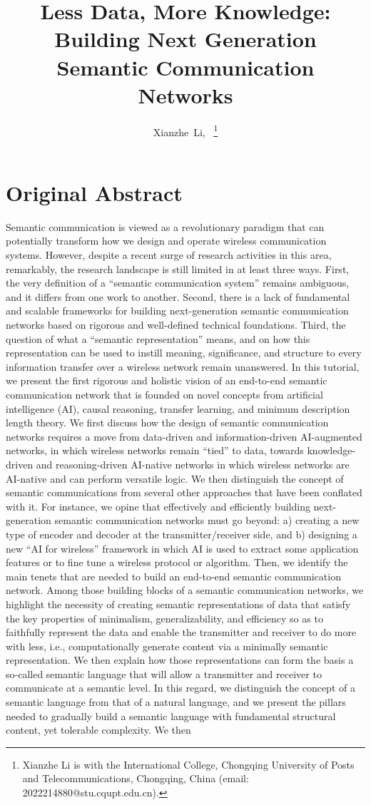\documentclass[journal]{IEEEtran}
\title{Less Data, More Knowledge: Building Next Generation Semantic Communication Networks}
\author{Xianzhe~Li,~\IEEEmembership{Student ID:~2022214880} 
\thanks{Xianzhe Li is with the International College, Chongqing University of Posts and Telecommunications, Chongqing, China (email: 2022214880@stu.cqupt.edu.cn).}
}
\begin{document}
\maketitle

\section{Original Abstract}
Semantic communication is viewed as a revolutionary paradigm that can potentially transform how we design and operate wireless communication systems. However, despite a recent surge of research activities in this area, remarkably, the research landscape is still limited in at least three ways. First, the very definition of a “semantic communication system” remains ambiguous, and it differs from one work to another. Second, there is a lack of fundamental and scalable frameworks for building next-generation semantic communication networks based on rigorous and well-defined technical foundations. Third, the question of what a “semantic representation” means, and on how this representation can be used to instill meaning, significance, and structure to every information transfer over a wireless network remain unanswered. In this tutorial, we present the first rigorous and holistic vision of an end-to-end semantic communication network that is founded on novel concepts from artificial intelligence (AI), causal reasoning, transfer learning, and minimum description length theory. We first discuss how the design of semantic communication networks requires a move from data-driven and information-driven AI-augmented networks, in which wireless networks remain “tied” to data, towards knowledge-driven and reasoning-driven AI-native networks in which wireless networks are AI-native and can perform versatile logic. We then distinguish the concept of semantic communications from several other approaches that have been conflated with it. For instance, we opine that effectively and efficiently building next-generation semantic communication networks must go beyond: a) creating a new type of encoder and decoder at the transmitter/receiver side, and b) designing a new “AI for wireless” framework in which AI is used to extract some application features or to fine tune a wireless protocol or algorithm. Then, we identify the main tenets that are needed to build an end-to-end semantic communication network. Among those building blocks of a semantic communication networks, we highlight the necessity of creating semantic representations of data that satisfy the key properties of minimalism, generalizability, and efficiency so as to faithfully represent the data and enable the transmitter and receiver to do more with less, i.e., computationally generate content via a minimally semantic representation. We then explain how those representations can form the basis a so-called semantic language that will allow a transmitter and receiver to communicate at a semantic level. In this regard, we distinguish the concept of a semantic language from that of a natural language, and we present the pillars needed to gradually build a semantic language with fundamental structural content, yet tolerable complexity. We then 
\end{document}
